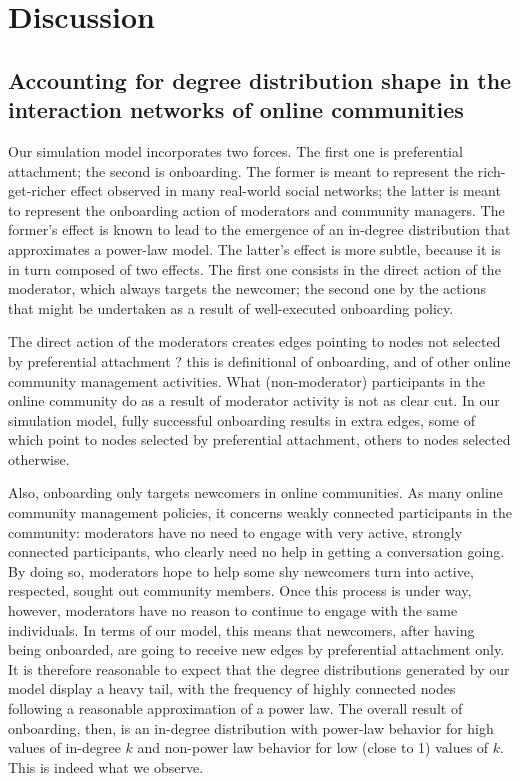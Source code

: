 \section{Discussion}

\subsection{Accounting for degree distribution shape in the interaction networks of online communities}

Our simulation model incorporates two forces. The first one is preferential attachment; the second is onboarding. The former is meant to represent the rich-get-richer effect observed in many real-world social networks; the latter is meant to represent the onboarding action of moderators and community managers. The former's effect is known to lead to the emergence of an in-degree distribution that approximates a power-law model. The latter's effect is more subtle, because it is in turn composed of two effects. The first one consists in the direct action of the moderator, which  always targets the newcomer; the second one by the actions that might be undertaken as a result of well-executed onboarding policy. 

The direct action of the moderators creates edges pointing to nodes not selected by preferential attachment ? this is definitional of onboarding, and of other online community management activities. What (non-moderator) participants in the online community do as a result of moderator activity is not as clear cut. In our simulation model, fully successful onboarding results in extra edges, some of which point to nodes selected by preferential attachment, others to nodes selected otherwise. 

Also, onboarding only targets newcomers in online communities. As many online community management policies, it concerns weakly connected participants in the community: moderators have no need to engage with very active, strongly connected participants, who clearly need no help in getting a conversation going. By doing so, moderators hope to help some shy newcomers turn into active, respected, sought out community members. Once this process is under way, however, moderators have no reason to continue to engage with the same individuals. In terms of our model, this means that newcomers, after having being onboarded, are going to receive new edges by preferential attachment only. It is therefore reasonable to expect that the degree distributions generated by our model display a heavy tail, with the frequency of highly connected nodes following a reasonable approximation of a power law. The overall result of onboarding, then, is an in-degree distribution with power-law behavior for high values of in-degree $k$ and non-power law behavior for low (close to 1) values of $k$. This is indeed what we observe. 

